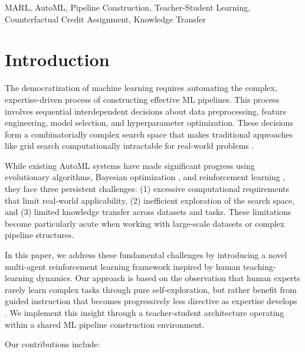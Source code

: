 \documentclass[twoside,11pt]{article}
\begin{document}
\begin{keywords}
  MARL, AutoML, Pipeline Construction, Teacher-Student Learning, Counterfactual Credit Assignment, Knowledge Transfer
\end{keywords}

\section{Introduction}

The democratization of machine learning requires automating the complex, expertise-driven process of constructing effective ML pipelines. This process involves sequential interdependent decisions about data preprocessing, feature engineering, model selection, and hyperparameter optimization. These decisions form a combinatorially complex search space that makes traditional approaches like grid search computationally intractable for real-world problems \citep{feurer2019auto}.

While existing AutoML systems have made significant progress using evolutionary algorithms, Bayesian optimization \citep{feurer2019auto}, and reinforcement learning \citep{zoph2017neural}, they face three persistent challenges: (1) excessive computational requirements that limit real-world applicability, (2) inefficient exploration of the search space, and (3) limited knowledge transfer across datasets and tasks. These limitations become particularly acute when working with large-scale datasets or complex pipeline structures.

In this paper, we address these fundamental challenges by introducing a novel multi-agent reinforcement learning framework inspired by human teaching-learning dynamics. Our approach is based on the observation that human experts rarely learn complex tasks through pure self-exploration, but rather benefit from guided instruction that becomes progressively less directive as expertise develops \citep{simard2013machine}. We implement this insight through a teacher-student architecture operating within a shared ML pipeline construction environment.

Our contributions include:
\end{document}

